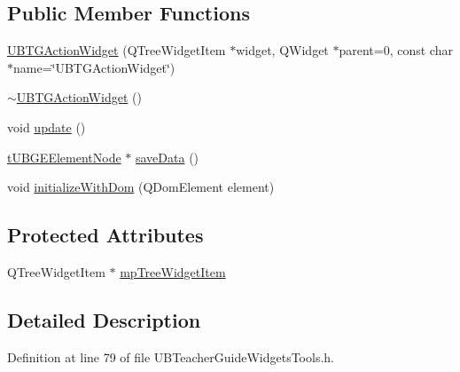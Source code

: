 \subsection*{Public Member Functions}
\begin{DoxyCompactItemize}
\item 
\hyperlink{class_u_b_t_g_action_widget_a4208c03d9ae6e8a88c1cfe228985fb76}{U\-B\-T\-G\-Action\-Widget} (Q\-Tree\-Widget\-Item $\ast$widget, Q\-Widget $\ast$parent=0, const char $\ast$name=\char`\"{}U\-B\-T\-G\-Action\-Widget\char`\"{})
\item 
\hyperlink{class_u_b_t_g_action_widget_a64148050f6dd9e22b5d3f2833cfa91f3}{$\sim$\-U\-B\-T\-G\-Action\-Widget} ()
\item 
void \hyperlink{class_u_b_t_g_action_widget_afb988d94f06ae075c789bfed45f70529}{update} ()
\item 
\hyperlink{structt_u_b_g_e_element_node}{t\-U\-B\-G\-E\-Element\-Node} $\ast$ \hyperlink{class_u_b_t_g_action_widget_ab4852de607569d131765fa590ccf23af}{save\-Data} ()
\item 
void \hyperlink{class_u_b_t_g_action_widget_a52483fd0d2987ae7257aca6f77ccadc6}{initialize\-With\-Dom} (Q\-Dom\-Element element)
\end{DoxyCompactItemize}
\subsection*{Protected Attributes}
\begin{DoxyCompactItemize}
\item 
Q\-Tree\-Widget\-Item $\ast$ \hyperlink{class_u_b_t_g_action_widget_a086b9638e6e8ef218e96b33bc6a1ebc2}{mp\-Tree\-Widget\-Item}
\end{DoxyCompactItemize}


\subsection{Detailed Description}


Definition at line 79 of file U\-B\-Teacher\-Guide\-Widgets\-Tools.\-h.



